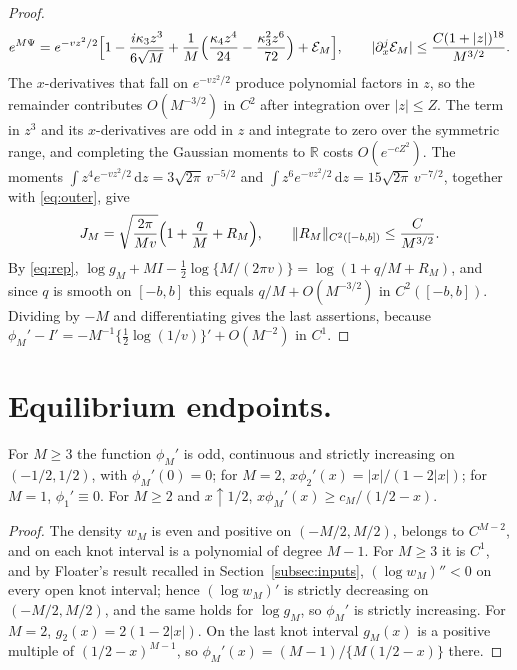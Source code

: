 \documentclass{math}
\let\TJMoriginalint\int
\renewcommand{\int}{\TJMoriginalint\limits}
\newcommand{\R}{\mathbb R}
\newcommand{\ii}{\mathit{i}}
\newcommand{\dd}{\,\mathrm d}
\begin{document}
\begin{proof}
\begin{equation}\label{eq:expansion}
e^{M\Psi}=e^{-vz^2/2}\Bigl[1-\frac{\ii\kappa_3z^3}{6\sqrt M}+\frac1M\Bigl(\frac{\kappa_4z^4}{24}-\frac{\kappa_3^2z^6}{72}\Bigr)+\mathcal E_M\Bigr],\qquad |\partial_x^j\mathcal E_M|\le\frac{C(1+|z|)^{18}}{M^{3/2}} .
\end{equation}
The $x$-derivatives that fall on $e^{-vz^2/2}$ produce polynomial factors in $z$, so the remainder contributes $O(M^{-3/2})$ in $C^2$ after integration over $|z|\le Z$. The term in $z^3$ and its $x$-derivatives are odd in $z$ and integrate to zero over the symmetric range, and completing the Gaussian moments to $\R$ costs $O(e^{-cZ^2})$. The moments $\int z^4e^{-vz^2/2}\dd z=3\sqrt{2\pi}\,v^{-5/2}$ and $\int z^6e^{-vz^2/2}\dd z=15\sqrt{2\pi}\,v^{-7/2}$, together with \eqref{eq:outer}, give
\begin{equation}\label{eq:JM}
J_M=\sqrt{\frac{2\pi}{Mv}}\Bigl(1+\frac qM+R_M\Bigr),\qquad \|R_M\|_{C^2([-b,b])}\le\frac C{M^{3/2}} .
\end{equation}
By \eqref{eq:rep}, $\log g_M+MI-\frac12\log\{M/(2\pi v)\}=\log(1+q/M+R_M)$, and since $q$ is smooth on $[-b,b]$ this equals $q/M+O(M^{-3/2})$ in $C^2([-b,b])$. Dividing by $-M$ and differentiating gives the last assertions, because $\phi_M'-I'=-M^{-1}\{\frac12\log(1/v)\}'+O(M^{-2})$ in $C^1$.
\end{proof}

\section{Equilibrium endpoints.}\label{sec:endpoint}
\begin{lemma}\label{lem:spline}
For $M\ge3$ the function $\phi_M'$ is odd, continuous and strictly increasing on $(-1/2,1/2)$, with $\phi_M'(0)=0$; for $M=2$, $x\phi_2'(x)=|x|/(1-2|x|)$; for $M=1$, $\phi_1'\equiv0$. For $M\ge2$ and $x\uparrow1/2$, $x\phi_M'(x)\ge c_M/(1/2-x)$.
\end{lemma}

\begin{proof}
The density $w_M$ is even and positive on $(-M/2,M/2)$, belongs to $C^{M-2}$, and on each knot interval is a polynomial of degree $M-1$. For $M\ge3$ it is $C^1$, and by Floater's result recalled in Section~\ref{subsec:inputs}, $(\log w_M)''<0$ on every open knot interval; hence $(\log w_M)'$ is strictly decreasing on $(-M/2,M/2)$, and the same holds for $\log g_M$, so $\phi_M'$ is strictly increasing. For $M=2$, $g_2(x)=2(1-2|x|)$. On the last knot interval $g_M(x)$ is a positive multiple of $(1/2-x)^{M-1}$, so $\phi_M'(x)=(M-1)/\{M(1/2-x)\}$ there.
\end{proof}
\end{document}

